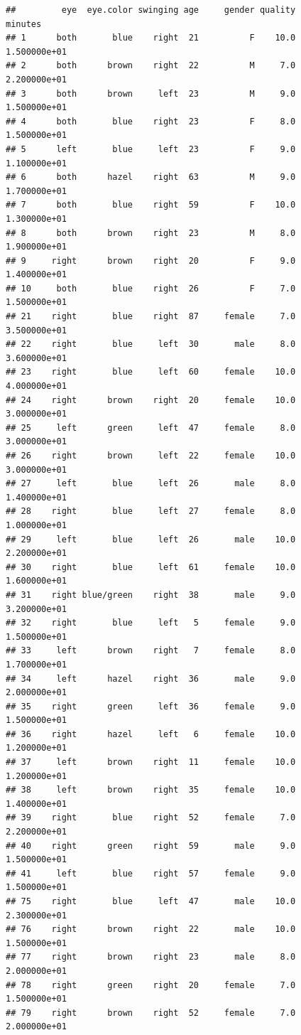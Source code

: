 \documentclass[]{article}
\begin{document}
\begin{verbatim}
##         eye  eye.color swinging age     gender quality       minutes
## 1      both       blue    right  21          F    10.0  1.500000e+01
## 2      both      brown    right  22          M     7.0  2.200000e+01
## 3      both      brown     left  23          M     9.0  1.500000e+01
## 4      both       blue    right  23          F     8.0  1.500000e+01
## 5      left       blue     left  23          F     9.0  1.100000e+01
## 6      both      hazel    right  63          M     9.0  1.700000e+01
## 7      both       blue    right  59          F    10.0  1.300000e+01
## 8      both      brown    right  23          M     8.0  1.900000e+01
## 9     right      brown    right  20          F     9.0  1.400000e+01
## 10     both       blue    right  26          F     7.0  1.500000e+01
## 21    right       blue    right  87     female     7.0  3.500000e+01
## 22    right       blue     left  30       male     8.0  3.600000e+01
## 23    right       blue     left  60     female    10.0  4.000000e+01
## 24    right      brown    right  20     female    10.0  3.000000e+01
## 25     left      green     left  47     female     8.0  3.000000e+01
## 26    right      brown     left  22     female    10.0  3.000000e+01
## 27     left       blue     left  26       male     8.0  1.400000e+01
## 28    right       blue     left  27     female     8.0  1.000000e+01
## 29     left       blue     left  26       male    10.0  2.200000e+01
## 30    right       blue     left  61     female    10.0  1.600000e+01
## 31    right blue/green    right  38       male     9.0  3.200000e+01
## 32    right       blue     left   5     female     9.0  1.500000e+01
## 33     left      brown    right   7     female     8.0  1.700000e+01
## 34     left      hazel    right  36       male     9.0  2.000000e+01
## 35    right      green     left  36     female     9.0  1.500000e+01
## 36    right      hazel     left   6     female    10.0  1.200000e+01
## 37     left      brown    right  11     female    10.0  1.200000e+01
## 38     left      brown    right  35     female    10.0  1.400000e+01
## 39    right       blue    right  52     female     7.0  2.200000e+01
## 40    right      green    right  59       male     9.0  1.500000e+01
## 41     left       blue    right  57     female     9.0  1.500000e+01
## 75    right       blue     left  47       male    10.0  2.300000e+01
## 76    right      brown    right  22       male    10.0  1.500000e+01
## 77    right      brown    right  23       male     8.0  2.000000e+01
## 78    right      green    right  20     female     7.0  1.500000e+01
## 79    right      brown    right  52     female     7.0  2.000000e+01

\end{verbatim}
\end{document}
